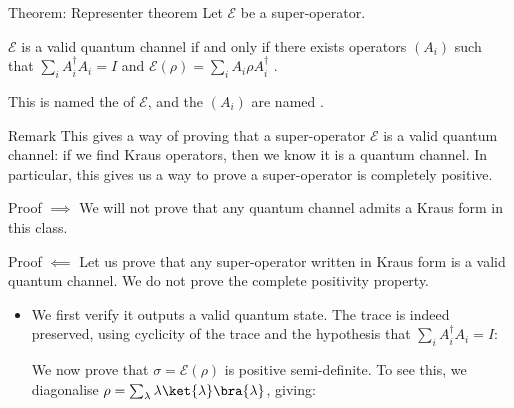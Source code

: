 \documentclass[a4paper]{article}
\begin{document}
\begin{parag}{Theorem: Representer theorem}
    Let $\mathcal{E}$ be a super-operator.

    $\mathcal{E}$ is a valid quantum channel if and only if there exists operators $\left(A_i\right)$ such that $\sum_{i} A_i^{\dagger} A_i = I$ and $\mathcal{E}\left(\rho\right) = \sum_{i} A_i \rho A_i^{\dagger}$ .

    This is named the  of $\mathcal{E}$, and the $\left(A_i\right)$ are named .

    \begin{subparag}{Remark}
        This gives a way of proving that a super-operator $\mathcal{E}$ is a valid quantum channel: if we find Kraus operators, then we know it is a quantum channel. In particular, this gives us a way to prove a super-operator is completely positive.
    \end{subparag}

    \begin{subparag}{Proof $\implies$}
        We will not prove that any quantum channel admits a Kraus form in this class.
    \end{subparag}

    \begin{subparag}{Proof $\impliedby$}
        Let us prove that any super-operator written in Kraus form is a valid quantum channel. We do not prove the complete positivity property.

        \begin{itemize}[left=0pt]
            \item We first verify it outputs a valid quantum state. The trace is indeed preserved, using cyclicity of the trace and the hypothesis that $\sum_{i} A_i^{\dagger} A_i = I$: 

            We now prove that $\sigma = \mathcal{E}\left(\rho\right)$ is positive semi-definite. To see this, we diagonalise $\rho = \sum_{\lambda} \lambda \ket{\lambda}\bra{\lambda}$, giving: 
            

\end{itemize}
\end{subparag}
\end{parag}
\end{document}
